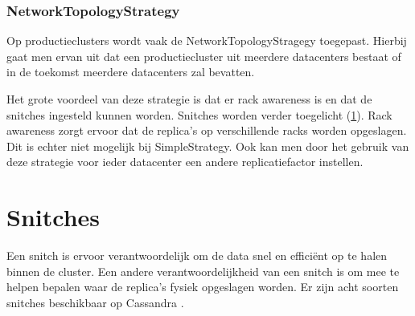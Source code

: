 	
\subsubsection{NetworkTopologyStrategy}
Op productieclusters wordt vaak de NetworkTopologyStragegy toegepast.
Hierbij gaat men ervan uit dat een productiecluster uit meerdere datacenters bestaat of in de toekomst meerdere datacenters zal bevatten.

Het grote voordeel van deze strategie is dat er rack awareness is en dat de snitches ingesteld kunnen worden.
Snitches worden verder toegelicht (\ref{sec_snitch}).
Rack awareness zorgt ervoor dat de replica's op verschillende racks worden opgeslagen.
Dit is echter niet mogelijk bij SimpleStrategy.
Ook kan men door het gebruik van deze strategie voor ieder datacenter een andere replicatiefactor instellen.

\section{Snitches}
\label{sec_snitch}
Een snitch is ervoor verantwoordelijk om de data snel en efficiënt op te halen binnen de cluster.
Een andere verantwoordelijkheid van een snitch is om mee te helpen bepalen waar de replica's fysiek opgeslagen worden.
Er zijn acht soorten snitches beschikbaar op Cassandra \citep{strickland2014availability}.

